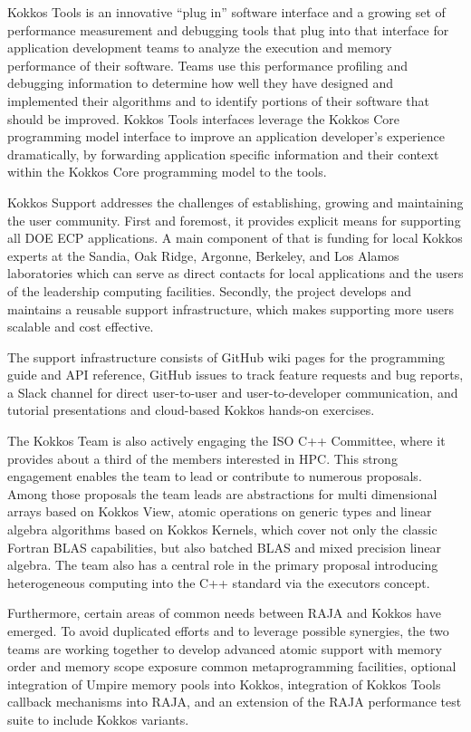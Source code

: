 Kokkos Tools is an innovative “plug in” software interface and a growing set of performance measurement and debugging tools that plug into that interface for application development teams to analyze the execution and memory performance of their software. Teams use this performance profiling and debugging information to determine how well they have designed and implemented their algorithms and to identify portions of their software that should be improved. Kokkos Tools interfaces  leverage the Kokkos Core programming model interface to improve an application developer’s experience dramatically, by forwarding application specific information and their context within the Kokkos Core programming model to the tools.

Kokkos Support addresses the challenges of establishing, growing and maintaining the user community.
First and foremost, it provides explicit means for supporting all DOE ECP applications. 
A main component of that is funding for local Kokkos experts at the Sandia, Oak Ridge, Argonne, Berkeley, and Los Alamos laboratories which can serve as direct contacts for local applications and the users of the leadership computing facilities. 
Secondly, the project develops and maintains a reusable support infrastructure, which makes supporting more users scalable and cost effective. 

The support infrastructure consists of GitHub wiki pages for the programming guide and API reference, GitHub issues to track feature requests and bug reports, a Slack channel for direct user-to-user and user-to-developer communication, and tutorial presentations and cloud-based Kokkos hands-on exercises. 

The Kokkos Team is also actively engaging the ISO C++ Committee, where it provides about a third of the members interested in HPC.
This strong engagement enables the team to lead or contribute to numerous proposals.
Among those proposals the team leads are abstractions for multi dimensional arrays based on Kokkos View, atomic operations on generic types and linear algebra algorithms based on Kokkos Kernels, which cover not only the classic Fortran BLAS capabilities, but also batched BLAS and mixed precision linear algebra.
The team also has a central role in the primary proposal introducing heterogeneous computing into the C++ standard via the executors concept.

Furthermore, certain areas of common needs between RAJA and Kokkos have emerged. 
To avoid duplicated efforts and to leverage possible synergies, the two teams are working together to develop 
advanced atomic support with memory order and memory scope exposure
common metaprogramming facilities,
optional integration of Umpire memory pools into Kokkos,
integration of Kokkos Tools callback mechanisms into RAJA, and
an extension of the RAJA performance test suite to include Kokkos variants.

